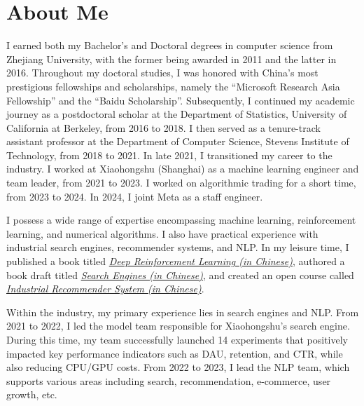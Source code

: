 \documentclass[11pt,a4paper]{moderncv}
\begin{document}
\maketitle
\vspace*{-14mm}



\section{About Me}


\qquad
I earned both my Bachelor's and Doctoral degrees in computer science from Zhejiang University, with the former being awarded in 2011 and the latter in 2016. Throughout my doctoral studies, I was honored with China's most prestigious fellowships and scholarships, namely the ``Microsoft Research Asia Fellowship'' and the ``Baidu Scholarship''. Subsequently, I continued my academic journey as a postdoctoral scholar at the Department of Statistics, University of California at Berkeley, from 2016 to 2018. I then served as a tenure-track assistant professor at the Department of Computer Science, Stevens Institute of Technology, from 2018 to 2021. In late 2021, I transitioned my career to the industry. I worked at Xiaohongshu (Shanghai) as a machine learning engineer and team leader, from 2021 to 2023. I worked on algorithmic trading for a short time, from 2023 to 2024. In 2024, I joint Meta as a staff engineer.



\qquad
I possess a wide range of expertise encompassing machine learning, reinforcement learning, and numerical algorithms. I also have practical experience with industrial search engines, recommender systems, and NLP. In my leisure time, I published a book titled \href{https://github.com/wangshusen/DRL/tree/master/Notes_CN}{\textit{Deep Reinforcement Learning (in Chinese)}}, authored a book draft titled \href{https://github.com/wangshusen/SearchEngine}{\textit{Search Engines (in Chinese)}}, and created an open course called \href{https://github.com/wangshusen/RecommenderSystem}{\textit{Industrial Recommender System (in Chinese)}}.




\qquad
Within the industry, my primary experience lies in search engines and NLP. From 2021 to  2022, I led the model team responsible for Xiaohongshu's search engine. During this time, my team successfully launched 14 experiments that positively impacted key performance indicators such as DAU, retention, and CTR, while also reducing CPU/GPU costs. From 2022 to 2023, I lead the NLP team, which supports various areas including search, recommendation, e-commerce, user growth, etc. 
\end{document}
